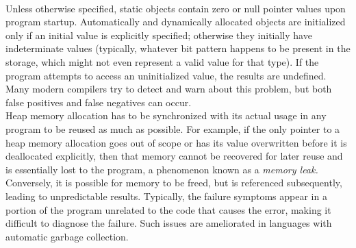 \documentclass{article}\usepackage{titlesec}
\begin{document}
\\
Unless otherwise specified, static objects contain zero or null pointer values upon program startup. Automatically and dynamically allocated objects are initialized only if an initial value is explicitly specified; otherwise they initially have indeterminate values (typically, whatever bit pattern happens to be present in the storage, which might not even represent a valid value for that type). If the program attempts to access an uninitialized value, the results are undefined. Many modern compilers try to detect and warn about this problem, but both false positives and false negatives can occur.
\\
Heap memory allocation has to be synchronized with its actual usage in any program to be reused as much as possible. For example, if the only pointer to a heap memory allocation goes out of scope or has its value overwritten before it is deallocated explicitly, then that memory cannot be recovered for later reuse and is essentially lost to the program, a phenomenon known as a \emph{memory leak.} Conversely, it is possible for memory to be freed, but is referenced subsequently, leading to unpredictable results. Typically, the failure symptoms appear in a portion of the program unrelated to the code that causes the error, making it difficult to diagnose the failure. Such issues are ameliorated in languages with automatic garbage collection.
\\
\end{document}
